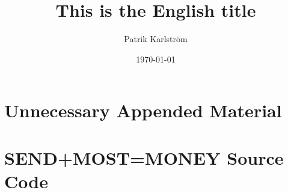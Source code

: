 \documentclass{kththesis}
\title{This is the English title}
\author{Patrik Karlström}
\date{\today}
\begin{document}
\frontmatter

\titlepage







\tableofcontents


\mainmatter







\printbibliography[heading=bibintoc] %

\appendix

\chapter{Unnecessary Appended Material}

\chapter{SEND+MOST=MONEY Source Code}

\end{document}
